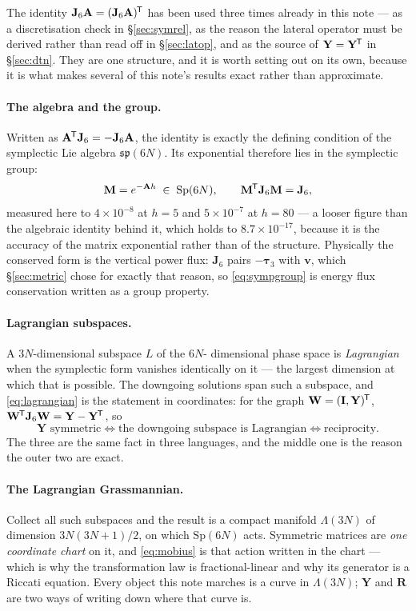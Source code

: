 \documentclass[11pt,a4paper]{article}
\newcommand{\bA}{\mathbf{A}}
\newcommand{\bv}{\mathbf{v}}
\newcommand{\bta}{\boldsymbol{\tau}}
\newcommand{\Jsix}{\mathbf{J}_{6}}
\newcommand{\tp}{^{\mkern-1.5mu\mathsf{T}}}
\newcommand{\bR}{\mathbf{R}}
\newcommand{\bY}{\mathbf{Y}}
\newcommand{\bM}{\mathbf{M}}
\begin{document}
The identity $\Jsix\bA=(\Jsix\bA)\tp$ has been used three times already in this
note --- as a discretisation check in \S\ref{sec:symrel}, as the reason the
lateral operator must be derived rather than read off in \S\ref{sec:latop}, and
as the source of $\bY=\bY\tp$ in \S\ref{sec:dtn}.  They are one structure, and
it is worth setting out on its own, because it is what makes several of this
note's results exact rather than approximate.

\paragraph{The algebra and the group.}  Written as $\bA\tp\Jsix = -\Jsix\bA$,
the identity is exactly the defining condition of the symplectic Lie algebra
$\mathfrak{sp}(6N)$.  Its exponential therefore lies in the symplectic group:
\begin{equation}\label{eq:sympgroup}
  \bM = e^{-\bA h} \;\in\; \mathrm{Sp}(6N),
  \qquad \bM\tp\Jsix\bM = \Jsix ,
\end{equation}
measured here to $4\times10^{-8}$ at $h=5$ and $5\times10^{-7}$ at $h=80$ --- a
looser figure than the algebraic identity behind it, which holds to
$8.7\times10^{-17}$, because it is the accuracy of the matrix exponential rather
than of the structure.  Physically the conserved form is the vertical power
flux: $\Jsix$ pairs $-\bta_3$ with $\bv$, which \S\ref{sec:metric} chose for
exactly that reason, so \eqref{eq:sympgroup} is energy flux conservation written
as a group property.

\paragraph{Lagrangian subspaces.}  A $3N$-dimensional subspace $L$ of the $6N$-%
dimensional phase space is \emph{Lagrangian} when the symplectic form vanishes
identically on it --- the largest dimension at which that is possible.  The
downgoing solutions span such a subspace, and \eqref{eq:lagrangian} is the
statement in coordinates: for the graph $\mathbf{W}=(\mathbf{I},\bY)\tp$,
$\mathbf{W}\tp\Jsix\mathbf{W}=\bY-\bY\tp$, so
\begin{equation}\label{eq:lagequiv}
  \bY \text{ symmetric}
  \iff
  \text{the downgoing subspace is Lagrangian}
  \iff
  \text{reciprocity.}
\end{equation}
The three are the same fact in three languages, and the middle one is the
reason the outer two are exact.

\paragraph{The Lagrangian Grassmannian.}  Collect all such subspaces and the
result is a compact manifold $\Lambda(3N)$ of dimension $3N(3N{+}1)/2$, on which
$\mathrm{Sp}(6N)$ acts.  Symmetric matrices are \emph{one coordinate chart} on
it, and \eqref{eq:mobius} is that action written in the chart --- which is why
the transformation law is fractional-linear and why its generator is a Riccati
equation.  Every object this note marches is a curve in $\Lambda(3N)$; $\bY$ and
$\bR$ are two ways of writing down where that curve is.
\end{document}
